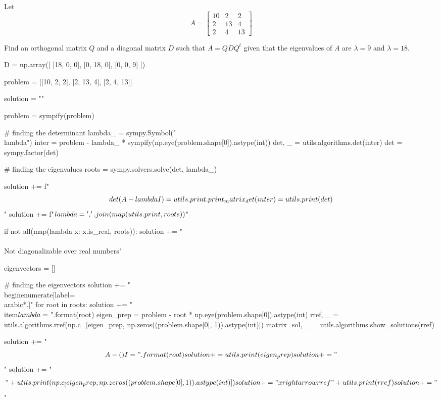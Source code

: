 \documentclass[letterpaper]{article}
\newenvironment{question}[2][Question]{\begin{trivlist}
\item[\hskip \labelsep {\bfseries #1}\hskip \labelsep {\bfseries #2.}]}{\end{trivlist}}
\begin{document}
\begin{question}{6.106}
  Let
  $$
  A=\left[ \begin{array}{rrr}{10} & {2} & {2} \\ {2} & {13} & {4} \\ {2} & {4} & {13}\end{array}\right]
  $$

  Find an orthogonal matrix $Q$ and a diagonal matrix $D$ such that $A=Q D Q^{t}$
  given that the eigenvalues of $A$ are $\lambda=9$ and $\lambda=18 .$

  \begin{pycode}
D = np.array([
  [18, 0, 0],
  [0, 18, 0],
  [0, 0, 9]
])

problem = [[10, 2, 2], [2, 13, 4], [2, 4, 13]]

solution = ""

problem = sympify(problem)

# finding the determinant 
lambda_ = sympy.Symbol("\\lambda")
inter = problem - lambda_ * sympify(np.eye(problem.shape[0]).astype(int))
det, _ = utils.algorithms.det(inter)
det = sympy.factor(det)

# finding the eigenvalues
roots = sympy.solvers.solve(det, lambda_)

solution += f"$$\\det(A - \\lambda I) = {utils.print.print_matrix_det(inter)} = {utils.print(det)}$$\n"
solution += f"$\\lambda = {', '.join(map(utils.print, roots))}$\n"

if not all(map(lambda x: x.is_real, roots)):
  solution += "\\\\Not diagonalizable over real numbers\n"

eigenvectors = []

# finding the eigenvectors 
solution += "\\begin{enumerate}[label=\\arabic*.]\n"
for root in roots:
  solution += "\\item$\\lambda = {}$\n".format(root)
  eigen_prep = problem - root * np.eye(problem.shape[0]).astype(int)
  rref, _ = utils.algorithms.rref(np.c_[eigen_prep, np.zeros((problem.shape[0], 1)).astype(int)])
  matrix_sol, _ = utils.algorithms.show_solutions(rref)

  solution += "$$A - ({}) I = ".format(root)
  solution += utils.print(eigen_prep)
  solution += "$$\n"
  solution += "$$" + utils.print(np.c_[eigen_prep, np.zeros((problem.shape[0], 1)).astype(int)])
  solution += "\\xrightarrow{rref}" + utils.print(rref)
  solution += "$$\n"


\end{pycode}
\end{question}
\end{document}
